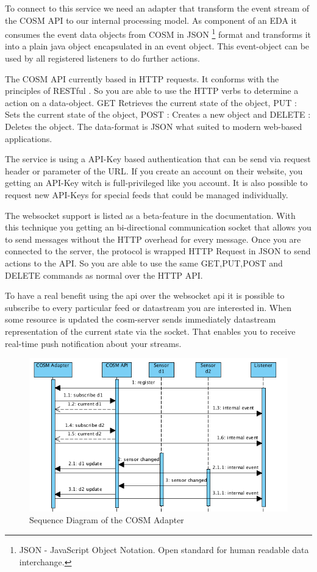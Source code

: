 \documentclass{acm_proc_article-sp}
\begin{document}
To connect to this service we need an adapter that transform the event stream of the COSM API to our internal processing model. As component of an EDA it consumes the event data objects from COSM in JSON
\footnote{JSON - JavaScript Object Notation. Open standard for human readable data interchange.} format and transforms it into a plain java object encapsulated in an event object.
This event-object can be used by all registered listeners to do further actions.

The COSM API currently based in HTTP requests. It conforms with the principles of RESTful . So you are able to use the HTTP verbs to determine a action on a data-object.
GET Retrieves the current state of the object,
PUT : Sets the current state of the object,
POST : Creates a new object and DELETE : Deletes the object.
The data-format is JSON what suited to modern web-based applications.

The service is using a API-Key based authentication that can be send via request header or parameter of the URL. If you create an account on their website, you getting an API-Key witch is full-privileged like you account. It is also possible to request new API-Keys for special feeds that could be managed individually.

The websocket support is listed as a beta-feature in the documentation. With this technique you getting an bi-directional communication socket that allows you to send messages without the HTTP overhead for every message.
Once you are connected to the server, the protocol is wrapped HTTP Request in JSON to send actions to the API. So you are able to use the same GET,PUT,POST and DELETE commands as normal over the HTTP API.

To have a real benefit using the api over the websocket api it is possible to subscribe to every particular feed or datastream you are interested in. When some resource is updated the cosm-server sends immediately datastream representation of the current state via the socket. That enables you to receive real-time push notification about your streams.


\begin{figure}[h]
	\begin{center}
		\includegraphics[scale=0.4]{sequence-diagram-cosm.png}
		\caption[Sequence Diagram of the COSM Adapter]{Sequence Diagram of the COSM Adapter}
		\label{fig:SequenceDiagram}
	\end{center}
\end{figure}
\end{document}
